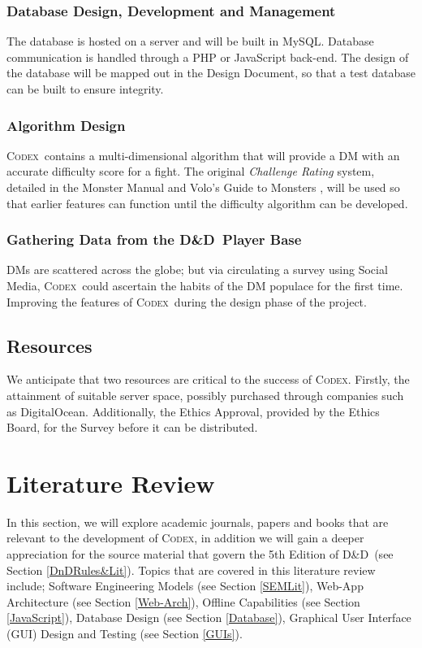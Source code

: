 \documentclass[review]{cmpreport}
\newcommand{\dnd}{D\&D}
\newcommand{\Codex}{\textsc{Codex}}
\begin{document}
	\subsubsection{Database Design, Development and Management}
	The database is hosted on a server and will be built in MySQL. Database communication is handled through a PHP or JavaScript back-end. The design of the database will be mapped out in the Design Document, so that a test database can be built to ensure integrity. 
	
	\subsubsection{Algorithm Design}
	\Codex \ contains a multi-dimensional algorithm that will provide a DM with an accurate difficulty score for a fight. The original \emph{Challenge Rating} system, detailed in the Monster Manual \citep{MonsterManual} and Volo's Guide to Monsters  \citep{Volos}, will be used so that earlier features can function until the difficulty algorithm can be developed. 
	
	\subsubsection{Gathering Data from the \dnd \ Player Base}
	DMs are scattered across the globe; but via circulating a survey using Social Media, \Codex \ could ascertain the habits of the DM populace for the first time. Improving the features of \Codex \ during the design phase of the project.
	
	\subsection{Resources}
	We anticipate that two resources are critical to the success of \Codex. Firstly, the attainment of suitable server space, possibly purchased through companies such as DigitalOcean. Additionally, the Ethics Approval, provided by the Ethics Board, for the Survey before it can be distributed. 
	
	\clearpage
	
	\section{Literature Review}
	In this section, we will explore academic journals, papers and books that are relevant to the development of \Codex, in addition we will gain a deeper appreciation for the source material that govern the 5th Edition of \dnd \ (see Section \ref{DnDRules&Lit}). Topics that are covered in this literature review include; Software Engineering Models (see Section \ref{SEMLit}), Web-App Architecture (see Section \ref{Web-Arch}), Offline Capabilities (see Section \ref{JavaScript}), Database Design (see Section \ref{Database}), Graphical User Interface (GUI) Design and Testing (see Section \ref{GUIs}).
	
\end{document}
